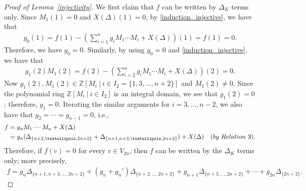 \documentclass[10pt,a4paper]{amsart}
\begin{document}
\begin{proof}[Proof of Lemma~\ref{injectivity}]
We first claim that $f$ can be written by $\Delta_{K}$ terms only.
Since $M_{1}(1)=0$ and $X(\Delta)(1)=0$, 
by \eqref{induction_injective}, we have that 
\begin{align*}
g_{0}(1)=f(1)-\left(\sum_{i=1}^{n}{g_{i}}M_{1}\cdots M_{i}+X(\Delta)\right)(1)=f(1)=0.
\end{align*}
Therefore, we have $g_{0}=0$.
Similarly, by using $g_{0}=0$ and \eqref{induction_injective}, we have that 
\begin{align*}
g_{1}(2)M_{1}(2)=f(2)-\left(\sum_{i=2}^{n}{g_{i}}M_{1}\cdots M_{i}+X(\Delta)\right)(2)=0.
\end{align*}
Now $g_{1}(2), M_{1}(2)\in \mathbb{Z}[M_{i}\ |\ i\in I_{2}=\{1,3,\ldots,n+2\}]$ and $M_{1}(2)\not=0$.
Since the polynomial ring $\mathbb{Z}[M_{i}\ |\ i\in I_{2}]$ is an integral domain, we see that $g_{1}(2)=0$; therefore, $g_{1}=0$.
Iterating the similar arguments for $i=3,\ldots, n-2$, 
we also have that $g_{2}=\cdots =g_{n-1}=0$, i.e., 
\begin{align*}
f&=g_{n}M_{1}\cdots M_{n}+X(\Delta) \\
&=g_{n}(\Delta_{\{n+2,\ldots, 2n+2\}}+\Delta_{\{n+1,n+3,\ldots, 2n+2\}})+X(\Delta) \quad ({\rm by\ Relation~3}). %
\end{align*}
Therefore, if $f(v)=0$ for every $v\in V_{2n}$, then $f$ can be written by the $\Delta_{K}$ terms only; more precisely, 
\begin{align}
\label{middle-eq}
f=g_{n}\Delta_{\{n+1,n+3,\ldots, 2n+2\}}+(g_{n}+g_{n}')\Delta_{\{n+2,\ldots, 2n+2\}}+g_{n+1}\Delta_{\{n+3,\ldots, 2n+2\}}+\cdots 
+g_{2n}\Delta_{\{2n+2\}}.
\end{align}


\end{proof}
\end{document}
